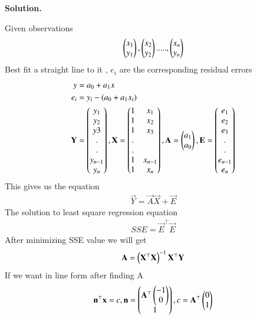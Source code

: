 \documentclass[journal,12pt,twocolumn]{IEEEtran}
\begin{document}
	\textbf{Solution.}
	
	
	Given observations
	\begin{align}
		 \begin{pmatrix}x_1\\y_1\end{pmatrix},\begin{pmatrix}x_2\\y_2\end{pmatrix}.....,\begin{pmatrix}x_n\\y_n\end{pmatrix}
	\end{align}
	Best fit a straight line to it , $e_i$ are the corresponding residual errors
	      \begin{align}
	      	y&=a_0+a_1x\\
	      	e_i&=y_i-\left(a_0+a_1x_i\right)\\
	      	\mathbf{Y}&=\begin{pmatrix}y_1\\y_2\\y3\\.\\.\\y_{n-1}\\y_n\end{pmatrix},
	      	\mathbf{X}=\begin{pmatrix}1&x_1\\1&x_2\\1& x_3\\.&\\.&\\1&x_{n-1}\\1&x_n\end{pmatrix},
	      	\mathbf{A}=\begin{pmatrix}a_1\\a_0\end{pmatrix},
	      	\mathbf{E}=\begin{pmatrix}e_1\\e_2\\e_3\\.\\.\\e_{n-1}\\e_n\end{pmatrix}
	      	\end{align}
      	This gives us the equation
      	\begin{align}
      		\vec{Y}=\vec{A}\vec{X}+\vec{E}
      	\end{align}
      The solution to least square regression equation
      \begin{align}
      	SSE=\vec{E}^{\top}\vec{E}
      \end{align}
  After minimizing SSE value we will get
      \begin{align}
        \mathbf{A}=\left(\mathbf{X}^{\top}\mathbf{X}\right)^{-1}\mathbf{X}^{\top}\mathbf{Y}
      \end{align}
  If we want in line form after finding A
  \begin{align}
  	\mathbf{n}^{\top}\mathbf{x}=c, \mathbf{n}=\begin{pmatrix}\mathbf{A}^{\top}\begin{pmatrix}-1\\0\end{pmatrix}\\1\end{pmatrix},c=\mathbf{A}^{\top}\begin{pmatrix}0\\1\end{pmatrix}
  \end{align}
\end{document}
